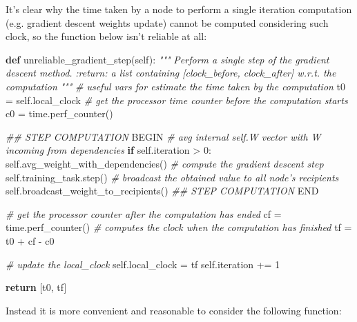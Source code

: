 \documentclass[11pt]{article}
\newenvironment{Shaded}{}{}
\newcommand{\KeywordTok}[1]{\textcolor[rgb]{0.00,0.44,0.13}{\textbf{{#1}}}}
\newcommand{\DecValTok}[1]{\textcolor[rgb]{0.25,0.63,0.44}{{#1}}}
\newcommand{\CommentTok}[1]{\textcolor[rgb]{0.38,0.63,0.69}{\textit{{#1}}}}
\newcommand{\RegionMarkerTok}[1]{{#1}}
\newcommand{\NormalTok}[1]{{#1}}
\newcommand{\VariableTok}[1]{\textcolor[rgb]{0.10,0.09,0.49}{{#1}}}
\newcommand{\ControlFlowTok}[1]{\textcolor[rgb]{0.00,0.44,0.13}{\textbf{{#1}}}}
\newcommand{\OperatorTok}[1]{\textcolor[rgb]{0.40,0.40,0.40}{{#1}}}
\begin{document}
It's clear why the time taken by a node to perform a single iteration
computation (e.g. gradient descent weights update) cannot be computed
considering such clock, so the function below isn't reliable at all:

    \begin{Shaded}
\begin{Highlighting}[]
\KeywordTok{def}\NormalTok{ unreliable_gradient_step(}\VariableTok{self}\NormalTok{):}
    \CommentTok{"""}
\CommentTok{    Perform a single step of the gradient descent method.}
\CommentTok{    :return: a list containing [clock_before, clock_after] w.r.t. the computation}
\CommentTok{    """}
    \CommentTok{# useful vars for estimate the time taken by the computation}
\NormalTok{    t0 }\OperatorTok{=} \VariableTok{self}\NormalTok{.local_clock}
    \CommentTok{# get the processor time counter before the computation starts}
\NormalTok{    c0 }\OperatorTok{=}\NormalTok{ time.perf_counter()}

    \CommentTok{## STEP COMPUTATION }\RegionMarkerTok{BEGIN}
    \CommentTok{# avg internal self.W vector with W incoming from dependencies}
    \ControlFlowTok{if} \VariableTok{self}\NormalTok{.iteration }\OperatorTok{>} \DecValTok{0}\NormalTok{:}
        \VariableTok{self}\NormalTok{.avg_weight_with_dependencies()}
    \CommentTok{# compute the gradient descent step}
    \VariableTok{self}\NormalTok{.training_task.step()}
    \CommentTok{# broadcast the obtained value to all node's recipients}
    \VariableTok{self}\NormalTok{.broadcast_weight_to_recipients()}
    \CommentTok{## STEP COMPUTATION }\RegionMarkerTok{END}
        
    \CommentTok{# get the processor counter after the computation has ended}
\NormalTok{    cf }\OperatorTok{=}\NormalTok{ time.perf_counter()}
    \CommentTok{# computes the clock when the computation has finished}
\NormalTok{    tf }\OperatorTok{=}\NormalTok{ t0 }\OperatorTok{+}\NormalTok{ cf }\OperatorTok{-}\NormalTok{ c0}
        
    \CommentTok{# update the local_clock}
    \VariableTok{self}\NormalTok{.local_clock }\OperatorTok{=}\NormalTok{ tf}
    \VariableTok{self}\NormalTok{.iteration }\OperatorTok{+=} \DecValTok{1}

    \ControlFlowTok{return}\NormalTok{ [t0, tf]}
\end{Highlighting}
\end{Shaded}

    Instead it is more convenient and reasonable to consider the following
function:
\end{document}
